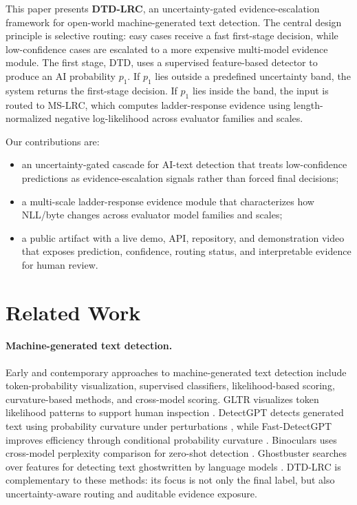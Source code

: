 \documentclass[11pt]{article}
\begin{document}
This paper presents \textbf{DTD-LRC}, an uncertainty-gated evidence-escalation framework for open-world machine-generated text detection. The central design principle is selective routing: easy cases receive a fast first-stage decision, while low-confidence cases are escalated to a more expensive multi-model evidence module. The first stage, DTD, uses a supervised feature-based detector to produce an AI probability $p_1$. If $p_1$ lies outside a predefined uncertainty band, the system returns the first-stage decision. If $p_1$ lies inside the band, the input is routed to MS-LRC, which computes ladder-response evidence using length-normalized negative log-likelihood across evaluator families and scales.

Our contributions are:
\begin{itemize}
    \item an uncertainty-gated cascade for AI-text detection that treats low-confidence predictions as evidence-escalation signals rather than forced final decisions;
    \item a multi-scale ladder-response evidence module that characterizes how NLL/byte changes across evaluator model families and scales;
    \item a public artifact with a live demo, API, repository, and demonstration video that exposes prediction, confidence, routing status, and interpretable evidence for human review.
\end{itemize}

\section{Related Work}

\paragraph{Machine-generated text detection.}
Early and contemporary approaches to machine-generated text detection include token-probability visualization, supervised classifiers, likelihood-based scoring, curvature-based methods, and cross-model scoring. GLTR visualizes token likelihood patterns to support human inspection \cite{gehrmann2019gltr}. DetectGPT detects generated text using probability curvature under perturbations \cite{mitchell2023detectgpt}, while Fast-DetectGPT improves efficiency through conditional probability curvature \cite{bao2024fastdetectgpt}. Binoculars uses cross-model perplexity comparison for zero-shot detection \cite{hans2024binoculars}. Ghostbuster searches over features for detecting text ghostwritten by language models \cite{verma2024ghostbuster}. DTD-LRC is complementary to these methods: its focus is not only the final label, but also uncertainty-aware routing and auditable evidence exposure.
\end{document}
